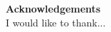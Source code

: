 %
%
\thispagestyle{plain}
{\noindent \huge \bf Acknowledgements}\\[20mm]
I would like to thank...


\cleardoublepage